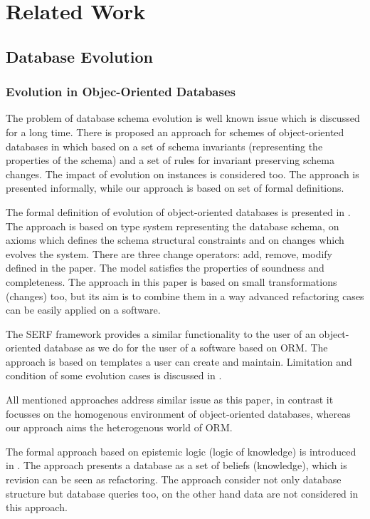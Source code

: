 \documentclass[11pt]{article}
\begin{document}
\section{Related Work}



\subsection{Database Evolution}
\subsubsection{Evolution in Objec-Oriented Databases}
The problem of database schema evolution is well known issue which is discussed for a long time. There is proposed an approach for  schemes of object-oriented databases in \cite{Banerjee:SemanticsOfSchemaEvolutionInOODB} which based on a set of schema invariants (representing the properties of the schema) and a set of rules for invariant preserving schema changes. The impact of evolution on instances is considered too. The approach is presented informally, while our approach is based on set of formal definitions.

The formal definition of evolution of object-oriented databases is presented in \cite{Peters:AxiomaticModelOfDynamicEvolutionInOODB}. The approach is based on type system representing the database schema, on axioms which defines the schema structural constraints and on changes which evolves the system. There are three change operators: add, remove, modify defined in the paper. The model satisfies the properties of soundness and completeness. The approach in this paper is based on small transformations (changes) too, but its aim is to combine them in a way advanced refactoring cases can be easily applied on a software. 

The SERF framework \cite{Claypool:SERF} provides a similar functionality to the user of an object-oriented database as we do for the user of a software based on ORM. The approach is based on templates a user can create and maintain. Limitation and condition of some evolution cases is discussed in \cite{Claypool:SERF-formal}.

All mentioned approaches address similar  issue as this paper, in contrast it focusses on the homogenous environment of object-oriented databases, whereas our approach aims the heterogenous world of ORM.  



The formal approach based on epistemic logic (logic of knowledge) is introduced in \cite{Chang-LogicFrameworkForDbRefactoring}. The approach presents a database as a set of beliefs (knowledge), which is revision can be seen as refactoring. The approach consider not only database structure but database queries too, on the other hand data are not considered in this approach.
\end{document}
